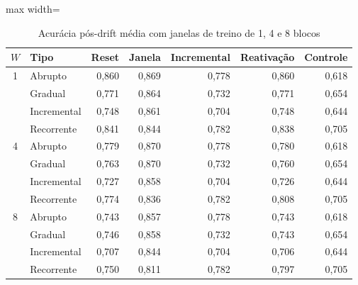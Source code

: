 \begin{table}[htbp]
\centering
\small
\caption{Acurácia pós-drift média com janelas de treino de 1, 4 e 8 blocos}
\label{tab:janela-treino}
\begin{adjustbox}{max width=\textwidth}
\begin{tabular}{clrrrrr}
\toprule
$W$ & Tipo & Reset & Janela & Incremental & Reativação & Controle \\
\midrule
1 & Abrupto & 0,860 & 0,869 & 0,778 & 0,860 & 0,618 \\
 & Gradual & 0,771 & 0,864 & 0,732 & 0,771 & 0,654 \\
 & Incremental & 0,748 & 0,861 & 0,704 & 0,748 & 0,644 \\
 & Recorrente & 0,841 & 0,844 & 0,782 & 0,838 & 0,705 \\
4 & Abrupto & 0,779 & 0,870 & 0,778 & 0,780 & 0,618 \\
 & Gradual & 0,763 & 0,870 & 0,732 & 0,760 & 0,654 \\
 & Incremental & 0,727 & 0,858 & 0,704 & 0,726 & 0,644 \\
 & Recorrente & 0,774 & 0,836 & 0,782 & 0,808 & 0,705 \\
8 & Abrupto & 0,743 & 0,857 & 0,778 & 0,743 & 0,618 \\
 & Gradual & 0,746 & 0,858 & 0,732 & 0,743 & 0,654 \\
 & Incremental & 0,707 & 0,844 & 0,704 & 0,706 & 0,644 \\
 & Recorrente & 0,750 & 0,811 & 0,782 & 0,797 & 0,705 \\
\bottomrule
\end{tabular}
\end{adjustbox}
\par\vspace{2pt}{\footnotesize Médias sobre severidades, classificadores e 10 repetições. $W$ = 1 corresponde ao fatorial principal.}
\end{table}
